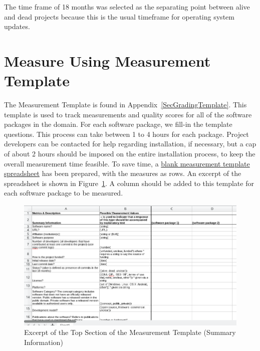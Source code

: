 \documentclass[letterpaper,cleveref]{lipics-v2019}
\begin{document}
\noindent The time frame of 18 months was selected as the separating point
between alive and dead projects because this is the usual timeframe for
operating system updates.

\section{Measure Using Measurement Template} \label{SecMeasureTemplate}

The Measurement Template is found in Appendix~\ref{SecGradingTemplate}.  This
template is used to track measurements and quality scores for all of the
software packages in the domain. For each software package, we fill-in the
template questions. This process can take between 1 to 4 hours for each package.
Project developers can be contacted for help regarding installation, if
necessary, but a cap of about 2 hours should be imposed on the entire
installation process, to keep the overall measurement time feasible.  To save
time, a
\href{https://github.com/smiths/AIMSS/blob/master/StateOfPractice/Methodology/Combined_MeasurementTemplate_EmpiricalMeasures.xlsx}{blank
measurement template spreadsheet} has been prepared, with the measures as rows.
An excerpt of the spreadsheet is shown in
Figure~\ref{measurement_template_image}.  A column should be added to this
template for each software package to be measured.

\begin{figure}[!ht]
	\begin{center}
	  \includegraphics[width=1.0\textwidth]{measurement_template}
	  \caption{Excerpt of the Top Section of the Measurement Template (Summary Information)}
	  \label{measurement_template_image}
	\end{center}
  \end{figure}
  
\end{document}
